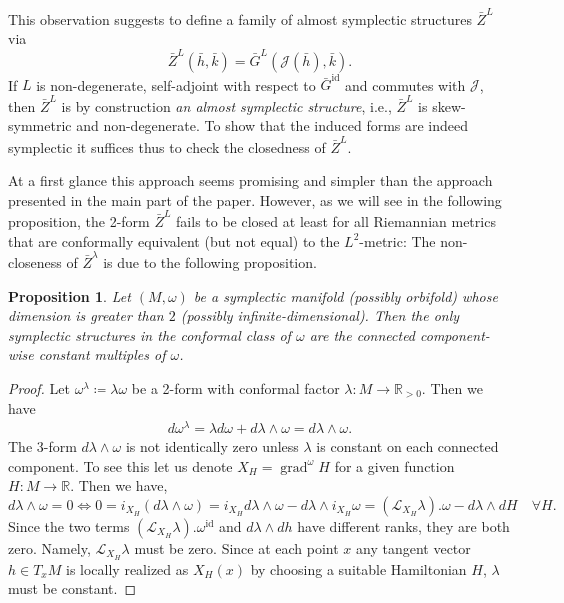 \documentclass[12pt]{amsart}
\newcommand{\rev}[1]{#1}
\newtheorem{proposition}[theorem]{Proposition}
\theoremstyle{definition}
\newcommand{\R}{\mathbb R}
\newcommand{\id}{\mathrm{id}}
\def\la{\lambda}
\def\L{\mathcal{L}}
\def\J{\mathcal{J}}
\def\R{{\mathbb R}}
\let\on=\operatorname
\begin{document}
This observation suggests to define a family of almost symplectic structures $\rev{\bar Z^L}$ via
\begin{equation}\label{eq:alternate_approach}
\rev{\bar Z}^{L}(\rev{\bar h,\bar k})=\bar G^{L}(\J(\rev{\bar h}),\rev{\bar k}).
\end{equation}
If $L$ is non-degenerate\rev{, self-adjoint with respect to $\bar G^{\id}$ and commutes with $\J$,} then $\rev{\bar Z}^{L}$ is by construction \emph{an almost symplectic structure}, i.e., $\rev{\bar Z}^{L}$ is skew-symmetric and non-degenerate.
To show that the induced forms are indeed symplectic it suffices thus to check the  closedness of $\rev{\bar Z}^{L}$. 

At a first glance this approach seems promising and simpler than the  approach \rev{presented in the main part of the paper}. However, \rev{as we will see in the following proposition, the 2-form}  $\rev{\bar Z}^{L}$ fails to be closed at least for all Riemannian metrics that are conformally equivalent (but not equal) to the $L^2$-metric: 
The non-closeness of $\rev{\bar Z}^{\la}$ \rev{is due to the following proposition.}
\rev{
\begin{proposition}\label{prop:no_conformal_symplectic}
    Let $(M,\omega)$ be a symplectic manifold (possibly orbifold) whose dimension is greater than $2$ (possibly infinite-dimensional). Then the only symplectic structures in the conformal class of $\omega$ are the connected component-wise constant multiples of $\omega$.
\end{proposition}
}
\begin{proof}
    \rev{
    Let $\omega^\lambda\coloneqq \lambda \omega$ be a 2-form with conformal factor $\lambda\colon M\to \R_{>0}$. Then we have
    \begin{align}
       d \omega^\lambda=\lambda d\omega+ d\lambda\wedge \omega 
       = d\lambda\wedge \omega.
    \end{align}
    }The 3-form \rev{$d\la\wedge \omega$} is not identically zero unless $\la$ is constant \rev{on each connected component}. To see this let us denote $X_H=\on{grad}^{\omega} H$ for a given function $H\colon M\to \R$. Then we have,
$$d\la\wedge \omega = 0 \iff 0=i_{X_H}(d\la\wedge \omega) = i_{X_H}d\la\wedge \omega - d\la \wedge i_{X_H}\omega = (\L_{X_H} \la).\omega - d\la\wedge dH \quad\forall H. $$
Since the two terms $(\L_{X_H} \la).\omega^\id$ and $ d\la\wedge dh$ have different ranks, they are both zero. Namely, $\L_{X_H} \la$ must be zero. Since at each point $x$ any tangent vector $h\in T_x M$ is locally realized as $X_H(x)$ by choosing  a suitable Hamiltonian $H$, $\la$ must be constant.
\end{proof}
\end{document}

